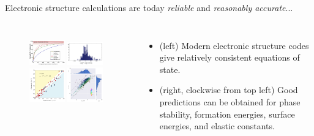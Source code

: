 \documentclass[aspectratio=169]{beamer}
\begin{document}
\begin{frame}{Electronic structure calculations are today \textit{reliable} and \textit{reasonably accurate}...}
\begin{columns}
\begin{figure}
        \centering
        \includegraphics[width=0.45\textwidth]{lectures/slides_tex/figures/icsd_e_hull.png}
        \includegraphics[width=0.45\textwidth]{lectures/slides_tex/figures/formation_energies.png}\\
        \includegraphics[width=0.45\textwidth]{lectures/slides_tex/figures/surface_energies.png}
        \includegraphics[width=0.45\textwidth]{lectures/slides_tex/figures/elastic_constants.png}
\end{figure}
\begin{itemize}
    \tiny
    \item (left) Modern electronic structure codes give relatively consistent equations of state.
    \item (right, clockwise from top left) Good predictions can be obtained for phase stability,\cite{sunThermodynamicScaleInorganic2016} formation energies, surface energies,\cite{tranSurfaceEnergiesElemental2016} and elastic constants\cite{dejongChartingCompleteElastic2015}.
\end{itemize}
\end{columns}
\end{frame}
\end{document}
